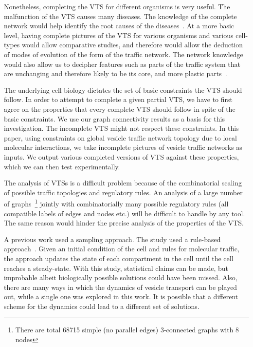 Nonetheless, completing the VTS for different organisms is very useful. 
%
The malfunction of the VTS causes many diseases.
%
The knowledge of the complete network would help identify the root causes of
the diseases~\cite{bexiga2013human,gissen2007cargos}. 
%
At a more basic level, having complete pictures of the VTS for various organisms and various cell-types would allow comparative studies, and therefore would allow the deduction of modes of evolution of the form of the traffic network. 
%
The network knowledge would also allow us to decipher features such as parts of the traffic system that are unchanging and therefore likely to be its core, and more plastic parts~\cite{barlow2017seeing}.

%
The underlying cell biology dictates the set of basic constraints the VTS should follow.
%
In order to attempt to complete a given partial VTS, we have to first agree on the properties that every complete VTS should follow in spite of the basic constraints. 
%
We use our graph connectivity results as a basis for this investigation.   
%
The incomplete VTS might not respect these constraints. 
%
In this paper, using constraints on global vesicle traffic network topology due to local molecular interactions, we take incomplete pictures of vesicle traffic networks as inputs.
%
We output various completed versions of VTS against these properties, which we can then test experimentally.
%

The analysis of VTSs is a difficult problem because
of the combinatorial scaling of possible traffic topologies and
regulatory rules.
%
An analysis of a large number of graphs~\footnote{There are total 68715 simple (no parallel edges) 3-connected graphs with 8 nodes} jointly with combinatorially many possible regulatory rules (all compatible labels of edges and nodes etc.) will be difficult to handle by any tool.
%
The same reason would hinder the precise analysis of the properties of the VTS. 

A previous work used a sampling approach. 
%
The study used a rule-based approach~\cite{mani2016stacking}.
Given an initial condition of the cell and rules for molecular traffic,
the approach updates the state of each compartment in the cell until the cell reaches a steady-state. 
%
With this study, statistical claims can be made, but improbable albeit biologically possible solutions could have been missed.
%
Also, there are many ways in which the dynamics of vesicle transport can be played out, while a single one was explored in this work. 
%
It is possible that a different scheme for the dynamics could lead to a different set of solutions.

